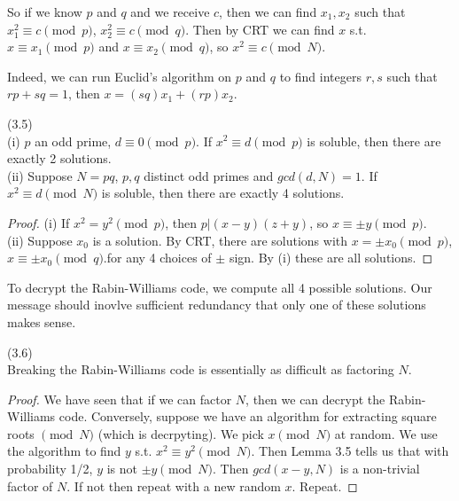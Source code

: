 \documentclass[a4paper]{article}
\begin{document}
So if we know $p$ and $q$ and we receive $c$, then we can find $x_1,x_2$ such that $x_1^2 \equiv c \pmod p$, $x_2^2 \equiv c \pmod q$. Then by CRT we can find $x$ s.t. $x \equiv x_1 \pmod p$ and $x \equiv x_2 \pmod q$, so $x^2 \equiv c \pmod N$.

Indeed, we can run Euclid's algorithm on $p$ and $q$ to find integers $r,s$ such that $rp+sq = 1$, then $x=(sq)x_1+(rp)x_2$.

\begin{lemma} (3.5)\\
(i) $p$ an odd prime, $d \equiv 0 \pmod p$. If $x^2 \equiv d \pmod p$ is soluble, then there are exactly 2 solutions.\\
(ii) Suppose $N = pq$, $p,q$ distinct odd primes and $gcd(d,N) = 1$. If $x^2 \equiv d \pmod N$ is soluble, then there are exactly 4 solutions.
\begin{proof}
(i) If $x^2 = y^2 \pmod p$, then $p|(x-y)(z+y)$, so $x \equiv \pm y \pmod p$.\\
(ii) Suppose $x_0$ is a solution. By CRT, there are solutions with $x=\pm x_0 \pmod p$, $x \equiv \pm x_0 \pmod q$.for any 4 choices of $\pm$ sign. By (i) these are all solutions.
\end{proof}
\end{lemma}

To decrypt the Rabin-Williams code, we compute all 4 possible solutions. Our message should inovlve sufficient redundancy that only one of these solutions makes sense.

\begin{thm} (3.6)\\
Breaking the Rabin-Williams code is essentially as difficult as factoring $N$.
\begin{proof}
We have seen that if we can factor $N$, then we can decrypt the Rabin-Williams code. Conversely, suppose we have an algorithm for extracting square roots $\pmod N$ (which is decrpyting). We pick $x \pmod N$ at random. We use the algorithm to find $y$ s.t. $x^2 \equiv y^2 \pmod N$. Then Lemma 3.5 tells us that with probability 1/2, $y$ is not $\pm y \pmod N$. Then $gcd(x-y,N)$ is a non-trivial factor of $N$. If not then repeat with a new random $x$. Repeat.
\end{proof}
\end{thm}

\end{document}
